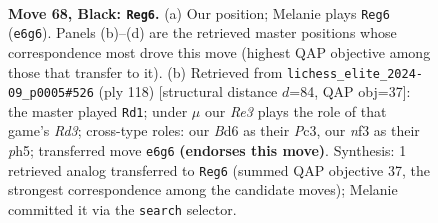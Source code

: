 \documentclass[11pt]{article}
\begin{document}
\begin{figure}[p]\centering
\begin{subfigure}{0.46\textwidth}\centering
\resizebox{\linewidth}{!}{%
\newchessgame
\chessboard[
  setfen={8/5kp1/p2br2r/Pppb1p1p/2p2P1P/2B1PNP1/1P2K3/1R4R1 b - - 9 68},
  showmover=false,
  pgfstyle=straightmove, color=movearrow, markmove={e6-g6}
]}
\caption{}
\end{subfigure}\hfill
\begin{subfigure}{0.46\textwidth}\centering
\resizebox{\linewidth}{!}{%
\newchessgame
\chessboard[
  setfen={2r4r/3bkp2/4p1p1/1p1pP2p/pP3P2/P1PRR1P1/4B2P/4K3 w - - 59 60},
  showmover=false,
  pgfstyle=straightmove, color=movearrow, markmove={d3-d1}
]}
\caption{}
\end{subfigure}
\\[4pt]

\caption{\textbf{Move 68, Black: \texttt{Reg6}.} (a) Our position; Melanie plays \texttt{Reg6} (\texttt{e6g6}). Panels (b)--(d) are the retrieved master positions whose correspondence most drove this move (highest QAP objective among those that transfer to it). (b) Retrieved from \texttt{lichess\_elite\_2024-09\_p0005\#526} (ply 118) [structural distance $d$=84, QAP obj=37]: the master played \texttt{Rd1}; under $\mu$ our \emph{Re3} plays the role of that game's \emph{Rd3}; cross-type roles: our \emph{B}d6 as their \emph{P}c3, our \emph{n}f3 as their \emph{p}h5; transferred move \texttt{e6g6} \textbf{(endorses this move)}. Synthesis: 1 retrieved analog transferred to \texttt{Reg6} (summed QAP objective 37, the strongest correspondence among the candidate moves); Melanie committed it via the \texttt{search} selector.}
\label{fig:thought-m135}
\end{figure}

\clearpage
\end{document}
